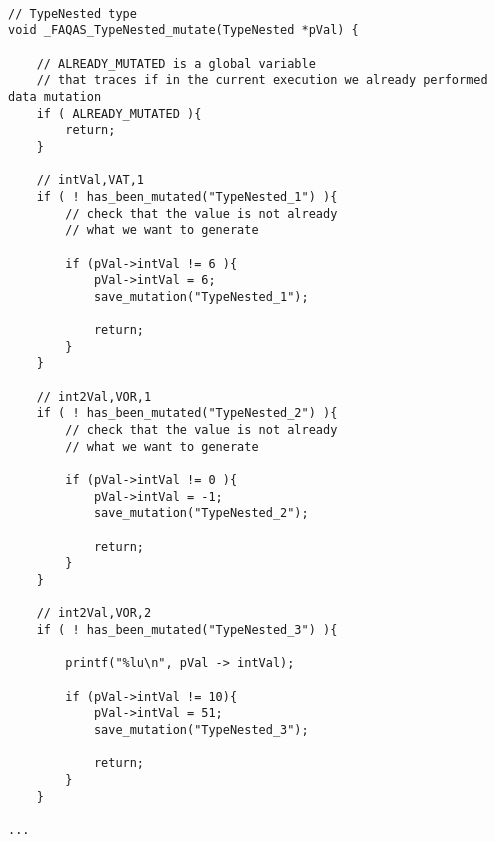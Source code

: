 
\begin{lstlisting}[style=CStyle, caption=Example of automatically generated ASN.1 data-driven mutation operations., label=ASN_mutations]

// TypeNested type
void _FAQAS_TypeNested_mutate(TypeNested *pVal) {

	// ALREADY_MUTATED is a global variable 
	// that traces if in the current execution we already performed data mutation
	if ( ALREADY_MUTATED ){
		return;
	}
	
	// intVal,VAT,1
	if ( ! has_been_mutated("TypeNested_1") ){
		// check that the value is not already 
		// what we want to generate

		if (pVal->intVal != 6 ){
			pVal->intVal = 6;
			save_mutation("TypeNested_1");

			return;
		}
	}
	
	// int2Val,VOR,1
	if ( ! has_been_mutated("TypeNested_2") ){
		// check that the value is not already 
		// what we want to generate

		if (pVal->intVal != 0 ){
			pVal->intVal = -1;
			save_mutation("TypeNested_2");

			return;
		}
	}

	// int2Val,VOR,2
	if ( ! has_been_mutated("TypeNested_3") ){

        printf("%lu\n", pVal -> intVal);

        if (pVal->intVal != 10){
            pVal->intVal = 51;
            save_mutation("TypeNested_3");

            return;
        }
    }

...

\end{lstlisting}

%
%
%
%
